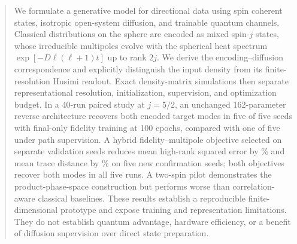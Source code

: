 \begin{abstract}
We formulate a generative model for directional data using spin coherent states, isotropic open-system diffusion, and trainable quantum channels. Classical distributions on the sphere are encoded as mixed spin-$j$ states, whose irreducible multipoles evolve with the spherical heat spectrum $\exp[-D\ell(\ell+1)t]$ up to rank $2j$. We derive the encoding--diffusion correspondence and explicitly distinguish the input density from its finite-resolution Husimi readout. Exact density-matrix simulations then separate representational resolution, initialization, supervision, and optimization budget. In a 40-run paired study at $j=5/2$, an unchanged 162-parameter reverse architecture recovers both encoded target modes in five of five seeds with final-only fidelity training at 100 epochs, compared with one of five under path supervision. A hybrid fidelity--multipole objective selected on separate validation seeds reduces mean high-rank squared error by \HybridRankReduction\% and mean trace distance by \HybridTraceReduction\% on five new confirmation seeds; both objectives recover both modes in all five runs. A two-spin pilot demonstrates the product-phase-space construction but performs worse than correlation-aware classical baselines. These results establish a reproducible finite-dimensional prototype and expose training and representation limitations. They do not establish quantum advantage, hardware efficiency, or a benefit of diffusion supervision over direct state preparation.
\end{abstract}
